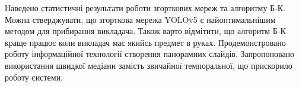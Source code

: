\chapterConclusion

Наведено статистичні результати роботи згорткових мереж та алгоритму Б-К. 
Можна стверджувати, що згорткова мережа YOLOv5 є найоптимальнішим методом для 
прибирання викладача. Також варто відмітити, що алгоритм Б-К краще працює 
коли викладач має якийсь предмет в руках. Продемонстровано роботу інформаційної
технології створення панорамних слайдів. Запропоновано використання швидкої 
медіани замість звичайної темпоральної, що прискорило роботу системи.